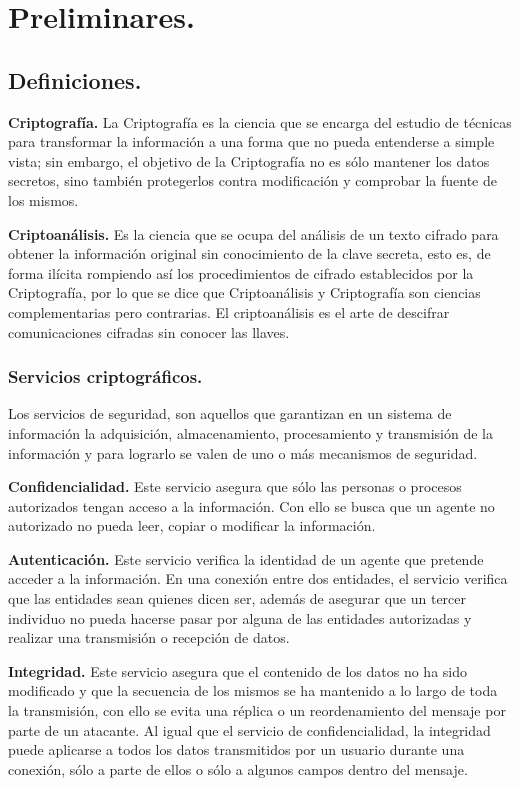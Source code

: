 \chapter{Preliminares. } %

\section{Definiciones. }
\textbf{Criptografía. }
La Criptografía es la ciencia que se encarga del estudio de técnicas para transformar la información a una forma que no pueda entenderse a simple vista; sin embargo, el objetivo de la Criptografía no es sólo mantener los datos secretos, sino también protegerlos contra modificación y comprobar la fuente de los mismos. 


\textbf{Criptoanálisis. }
Es la ciencia que se ocupa del análisis de un texto cifrado para obtener la información original sin conocimiento de la clave secreta, esto es, de forma ilícita rompiendo así los procedimientos de cifrado establecidos por la Criptografía, por lo que se dice que Criptoanálisis y Criptografía son ciencias complementarias pero contrarias.
El criptoanálisis es el arte de descifrar comunicaciones cifradas sin conocer las llaves.  ~\cite{cripto}


\subsection{Servicios criptográficos. }
Los servicios de seguridad, son aquellos que garantizan en un sistema de información la adquisición, almacenamiento, procesamiento y transmisión de la información y para lograrlo se valen de uno o más mecanismos de seguridad. 

\textbf{Confidencialidad. }
Este servicio asegura que sólo las personas o procesos autorizados tengan acceso a la información. Con ello se busca que un agente no autorizado no pueda leer, copiar o modificar la información. 

\textbf{Autenticación. }
Este servicio verifica la identidad de un agente que pretende acceder a la información. En una conexión entre dos entidades, el servicio verifica que las entidades sean quienes dicen ser, además de asegurar que un tercer individuo no pueda hacerse pasar por alguna de las entidades autorizadas y realizar una transmisión o recepción de datos. 

\textbf{Integridad. }
Este servicio asegura que el contenido de los datos no ha sido modificado y que la secuencia de los mismos se ha mantenido a lo largo de toda la transmisión, con ello se evita una réplica o un reordenamiento del mensaje por parte de un atacante.
Al igual que el servicio de confidencialidad, la integridad puede aplicarse a todos los datos transmitidos por un usuario durante una conexión, sólo a parte de ellos o sólo a algunos campos dentro del mensaje.  ~\cite{servicios}


